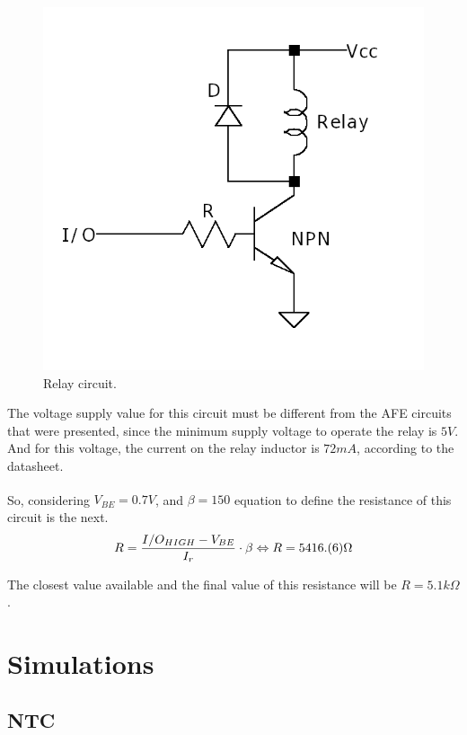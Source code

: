 \documentclass[12pt]{article}
\begin{document}
    \begin{figure}[H] 
        \centering
        \includegraphics*[scale = 0.4]{images/RelayDrive.png}
        \caption{Relay circuit.}
        \label{relaycircuit}
    \end{figure}

    The voltage supply value for this circuit must be different from the AFE circuits that were presented, since the minimum supply voltage to operate the relay is $5V$. And for this voltage, the current on the relay inductor is $72mA$, according to the datasheet.
    
    So, considering $V_{BE} = 0.7V$, and $\beta = 150$ \textsuperscript{\cite{bc547-datasheet}} equation to define the resistance of this circuit is the next.
    \begin{equation}
        R = \frac{I/O_{HIGH}-V_{BE}}{I_r}\cdot \beta\\
        \Leftrightarrow R = 5416.(6) \Omega
    \end{equation}

    The closest value available and the final value of this resistance will be $R = 5.1 k\Omega$.
\newpage
\section{Simulations}
\subsection{NTC}
    
\end{document}
